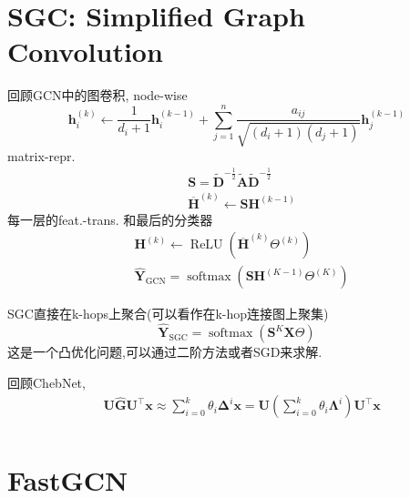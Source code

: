 \documentclass{article}
\begin{document}
\section{SGC: Simplified Graph Convolution}

    回顾GCN中的图卷积, node-wise
    \begin{equation}
        \mathbf{h}_{i}^{(k)} \leftarrow \frac{1}{d_{i}+1} \mathbf{h}_{i}^{(k-1)}+\sum_{j=1}^{n} \frac{a_{i j}}{\sqrt{\left(d_{i}+1\right)\left(d_{j}+1\right)}} \mathbf{h}_{j}^{(k-1)}
    \end{equation}
    matrix-repr.
    \begin{equation}
        \begin{aligned}
        &\mathbf{S}=\tilde{\mathbf{D}}^{-\frac{1}{2}} \tilde{\mathbf{A}} \tilde{\mathbf{D}}^{-\frac{1}{2}}\\
        &\overline{\mathbf{H}}^{(k)} \leftarrow \mathbf{S H}^{(k-1)}
        \end{aligned}
    \end{equation}
    每一层的feat.-trans. 和最后的分类器
    \begin{equation}
        \begin{aligned}
            &\mathbf{H}^{(k)} \leftarrow \operatorname{ReLU}\left(\overline{\mathbf{H}}^{(k)} \Theta^{(k)}\right)\\  
            &\hat{\mathbf{Y}}_{\mathrm{GCN}}=\operatorname{softmax}\left(\mathbf{S H}^{(K-1)} \Theta^{(K)}\right)
        \end{aligned}
    \end{equation}

    SGC直接在k-hops上聚合(可以看作在k-hop连接图上聚集)
    \begin{equation}
        \hat{\mathbf{Y}}_{\mathrm{SGC}}=\operatorname{softmax}\left(\mathbf{S}^{K} \mathbf{X} \Theta\right)
    \end{equation}
    这是一个凸优化问题,可以通过二阶方法或者SGD来求解.

    回顾ChebNet, 
    \begin{align}
        &\mathbf{U} \hat{\mathbf{G}} \mathbf{U}^{\top} \mathbf{x} \approx \sum_{i=0}^{k} \theta_{i} \boldsymbol{\Delta}^{i} \mathbf{x}=\mathbf{U}\left(\sum_{i=0}^{k} \theta_{i} \mathbf{\Lambda}^{i}\right) \mathbf{U}^{\top} \mathbf{x}\\
    \end{align}
    
\section{FastGCN}
\end{document}
